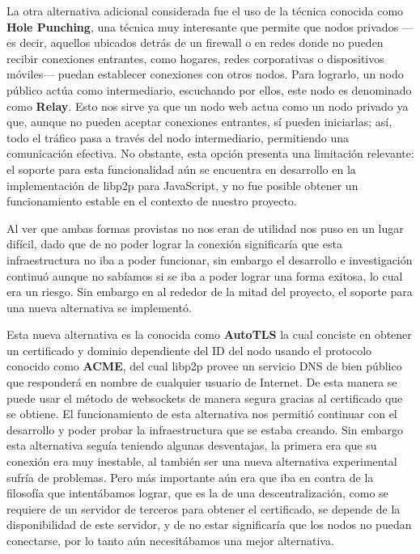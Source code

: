 La otra alternativa adicional considerada fue el uso de la técnica conocida como \textbf{Hole Punching}\cite{hole-punching}, una técnica muy interesante que permite que nodos privados —es decir, aquellos ubicados detrás de un firewall o en redes donde no pueden recibir conexiones entrantes, como hogares, redes corporativas o dispositivos móviles— puedan establecer conexiones con otros nodos. Para lograrlo, un nodo público actúa como intermediario, escuchando por ellos, este nodo es denominado como \textbf{Relay}. Esto nos sirve ya que un nodo web actua como un nodo privado ya que, aunque no pueden aceptar conexiones entrantes, sí pueden iniciarlas; así, todo el tráfico pasa a través del nodo intermediario, permitiendo una comunicación efectiva. No obstante, esta opción presenta una limitación relevante: el soporte para esta funcionalidad aún se encuentra en desarrollo en la implementación de libp2p para JavaScript, y no fue posible obtener un funcionamiento estable en el contexto de nuestro proyecto.

Al ver que ambas formas provistas no nos eran de utilidad nos puso en un lugar difícil, dado que de no poder lograr la conexión significaría que esta infraestructura no iba a poder funcionar, sin embargo el desarrollo e investigación continuó aunque no sabíamos si se iba a poder lograr una forma exitosa, lo cual era un riesgo. Sin embargo en al rededor de la mitad del proyecto, el soporte para una nueva alternativa se implementó.

Esta nueva alternativa es la conocida como \textbf{AutoTLS}\cite{autotls} la cual conciste en obtener un certificado y dominio dependiente del ID del nodo usando el protocolo conocido como \textbf{ACME}\cite{acme}, del cual libp2p provee un servicio DNS de bien público que responderá en nombre de cualquier usuario de Internet. De esta manera se puede usar el método de websockets de manera segura gracias al certificado que se obtiene. El funcionamiento de esta alternativa nos permitió continuar con el desarrollo y poder probar la infraestructura que se estaba creando. Sin embargo esta alternativa seguía teniendo algunas desventajas, la primera era que su conexión era muy inestable, al también ser una nueva alternativa experimental sufría de problemas. Pero más importante aún era que iba en contra de la filosofía que intentábamos lograr, que es la de una descentralización, como se requiere de un servidor de terceros para obtener el certificado, se depende de la disponibilidad de este servidor, y de no estar significaría que los nodos no puedan conectarse, por lo tanto aún necesitábamos una mejor alternativa.

